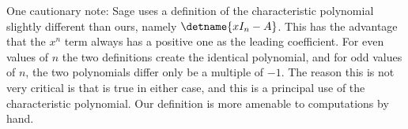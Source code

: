 %
One cautionary note: Sage uses a definition of the characteristic polynomial slightly different than ours, namely $\detname{xI_n-A}$.  This has the advantage that the $x^n$ term always has a positive one as the leading coefficient.  For even values of $n$ the two definitions create the identical polynomial, and for odd values of $n$, the two polynomials differ only be a multiple of $-1$.  The reason this is not very critical is that  is true in either case, and this is a principal use of the characteristic polynomial.  Our definition is more amenable to computations by hand.\par
%
\begin{sageverbatim}
\end{sageverbatim}
%

